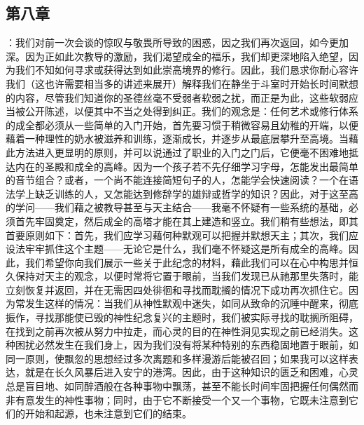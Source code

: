 
\subsection{第八章}

\par

：我们对前一次会谈的惊叹与敬畏所导致的困惑，因之我们再次返回，如今更加深。因为正如此次教导的激励，我们渴望成全的福乐，我们却更深地陷入绝望，因为我们不知如何寻求或获得达到如此崇高境界的修行。因此，我们恳求你耐心容许我们（这也许需要相当多的讲述来展开）解释我们在静坐于斗室时开始长时间默想的内容，尽管我们知道你的圣德丝毫不受弱者软弱之扰，而正是为此，这些软弱应当被公开陈述，以便其中不当之处得到纠正。我们的观念是：任何艺术或修行体系的成全都必须从一些简单的入门开始，首先要习惯于稍微容易且幼稚的开端，以便藉着一种理性的奶水被滋养和训练，逐渐成长，并逐步从最底层攀升至高境。当藉此方法进入更显明的原则，并可以说通过了职业的入门之门后，它便毫不困难地抵达内在的圣殿和成全的高峰。因为一个孩子若不先仔细学习字母，怎能发出最简单的音节组合？或者，一个尚不能连接简短句子的人，怎能学会快速阅读？一个在语法学上缺乏训练的人，又怎能达到修辞学的雄辩或哲学的知识？因此，对于这至高的学问——我们藉之被教导甚至与天主结合——我毫不怀疑有一些系统的基础，必须首先牢固奠定，然后成全的高塔才能在其上建造和竖立。我们稍有些想法，即其首要原则如下：首先，我们应学习藉何种默观可以把握并默想天主；其次，我们应设法牢牢抓住这个主题——无论它是什么，我们毫不怀疑这是所有成全的高峰。因此，我们希望你向我们展示一些关于此纪念的材料，藉此我们可以在心中构思并恒久保持对天主的观念，以便时常将它置于眼前，当我们发现已从祂那里失落时，能立刻恢复并返回，并在无需因四处徘徊和寻找而耽搁的情况下成功再次抓住它。因为常发生这样的情况：当我们从神性默观中迷失，如同从致命的沉睡中醒来，彻底振作，寻找那能使已毁的神性纪念复兴的主题时，我们被实际寻找的耽搁所阻碍，在找到之前再次被从努力中拉走，而心灵的目的在神性洞见实现之前已经消失。这种困扰必然发生在我们身上，因为我们没有将某种特别的东西稳固地置于眼前，如同一原则，使飘忽的思想经过多次离题和多样漫游后能被召回；如果我可以这样表达，就是在长久风暴后进入安宁的港湾。因此，由于这种知识的匮乏和困难，心灵总是盲目地、如同醉酒般在各种事物中飘荡，甚至不能长时间牢固把握任何偶然而非有意发生的神性事物；同时，由于它不断接受一个又一个事物，它既未注意到它们的开始和起源，也未注意到它们的结束。\par


